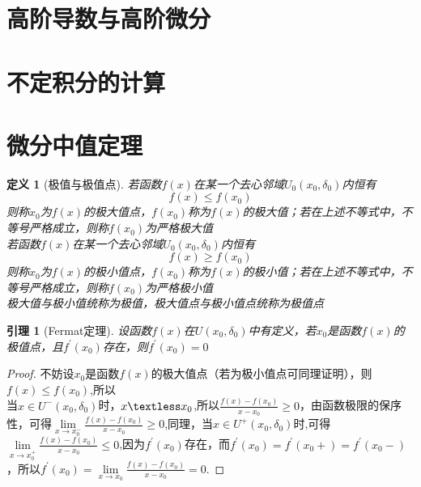 \documentclass[12pt, a4paper, oneside]{ctexart}
\newtheorem{definition}[theorem]{定义}
\newtheorem{lemma}[theorem]{引理}
\begin{document}
\section{高阶导数与高阶微分}

\section{不定积分的计算}

\section{微分中值定理}

\begin{definition}[极值与极值点]
若函数$f(x)$在某一个去心邻域$U_0(x_0,\delta_0)$内恒有
\begin{equation}
    f(x)\leq f(x_0)
\end{equation}
则称$x_0$为$f(x)$的极大值点，$f(x_0)$称为$f(x)$的极大值；若在上述不等式中，不等号严格成立，则称$f(x_0)$为严格极大值\\

若函数$f(x)$在某一个去心邻域$U_0(x_0,\delta_0)$内恒有
\begin{equation}
    f(x)\geq f(x_0)
\end{equation}
则称$x_0$为$f(x)$的极小值点，$f(x_0)$称为$f(x)$的极小值；若在上述不等式中，不等号严格成立，则称$f(x_0)$为严格极小值\\

极大值与极小值统称为极值，极大值点与极小值点统称为极值点

\end{definition}

\begin{lemma}[Fermat定理]
设函数$f(x)$在$U(x_0,\delta_0)$中有定义，若$x_0$是函数$f(x)$的极值点，且$f^{'}(x_0)$存在，则$f^{'}(x_0)=0$
\end{lemma}

\begin{proof}
不妨设$x_0$是函数$f(x)$的极大值点（若为极小值点可同理证明），则$f(x)\leq f(x_0)$,所以\\当$x\in U^{-}(x_0,\delta_0)$时，$x\textless x_0$,所以$\frac{f(x)-f(x_0)}{x-x_0}\geq 0$，由函数极限的保序性，可得$\lim\limits_{x\to x^{-}_0}\frac{f(x)-f(x_0)}{x-x_0}\geq 0$,同理，当$x\in U^{+}(x_0,\delta_0)$时,可得$\lim\limits_{x\to x^{+}_0}\frac{f(x)-f(x_0)}{x-x_0}\leq 0$,因为$f^{'}(x_0)$存在，而$f^{'}(x_0)=f^{'}(x_0+)=f^{'}(x_0-)$，所以$f^{'}(x_0)=\lim\limits_{x\to x_0}\frac{f(x)-f(x_0)}{x-x_0}=0$.
\end{proof}
\end{document}
